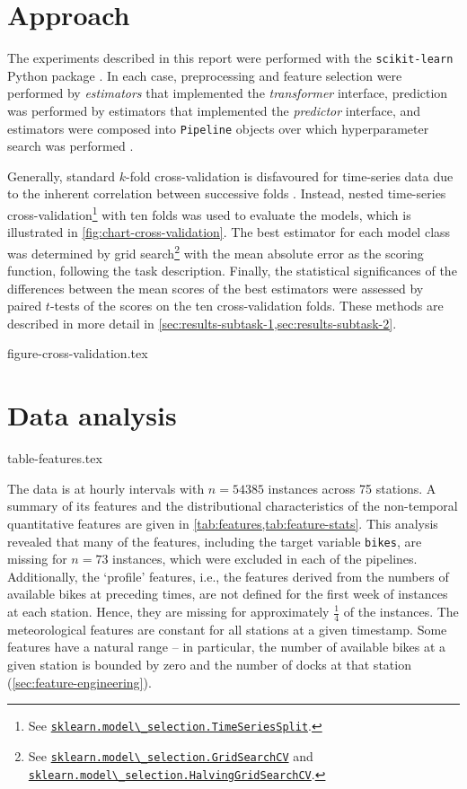 \documentclass[11pt]{extarticle}
\newcommand{\sklearn}[2]{\href{https://scikit-learn.org/stable/modules/generated/sklearn.#1.#2.html}{\lstinline|sklearn.#1.#2|}}
\begin{document}
\section{Approach}
\label{sec:approach}

The experiments described in this report were performed with the \texttt{scikit-learn}
Python package \parencite{Pedregosa2011}.
In each case, preprocessing and feature selection were performed by \emph{estimators}
that implemented the \emph{transformer} interface, prediction was performed by
estimators that implemented the \emph{predictor} interface, and estimators were
composed into \texttt{Pipeline} objects over which hyperparameter search was performed
\parencite[4-9]{Buitinck2013}.

Generally, standard $k$-fold cross-validation is disfavoured for time-series data due
to the inherent correlation between successive folds \parencite{Bergmeir2018}.
Instead, nested time-series cross-validation\footnote{See
  \sklearn{model\_selection}{TimeSeriesSplit}.
} with ten folds
was used to evaluate the models, which is illustrated in \cref{fig:chart-cross-validation}.
The best estimator for each model class was determined by grid search\footnote{See
  \sklearn{model\_selection}{GridSearchCV} and
  \sklearn{model\_selection}{HalvingGridSearchCV}.
} with the mean absolute
error as the scoring function, following the task description.
Finally, the statistical significances of the differences between the mean scores of
the best estimators were assessed by paired $t$-tests of the scores on the ten
cross-validation folds.
These methods are described in more detail in
\cref{sec:results-subtask-1,sec:results-subtask-2}.

{figure-cross-validation.tex}

\section{Data analysis}
\label{sec:data-analysis}

{table-features.tex}

The data is at hourly intervals with $n = 54385$ instances across 75 stations.
A summary of its features and the distributional characteristics of the non-temporal
quantitative features are given in \cref{tab:features,tab:feature-stats}.
This analysis revealed that many of the features, including the target variable
\texttt{bikes}, are missing for $n = 73$ instances, which were excluded in each of the
pipelines.
Additionally, the `profile' features, i.e., the features derived from the numbers of
available bikes at preceding times, are not defined for the first week of instances at
each station.
Hence, they are missing for approximately $\frac{1}{4}$ of the instances.
The meteorological features are constant for all stations at a given timestamp. Some
features have a natural range -- in particular, the number of available bikes at a
given station is bounded by zero and the number of docks at that station
(\cref{sec:feature-engineering}).
\end{document}
